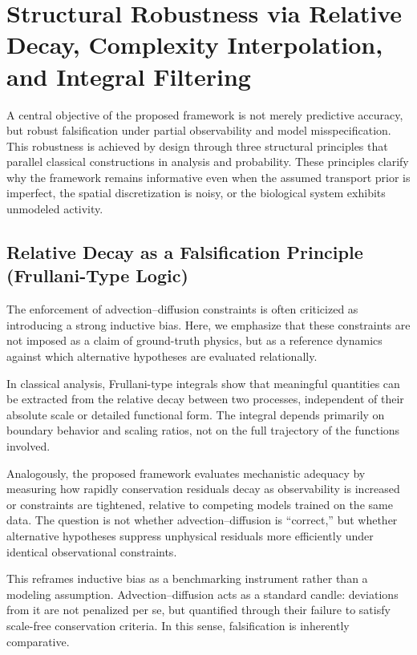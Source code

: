 \documentclass[10pt,article]{article}
\begin{document}
\section{Structural Robustness via Relative Decay, Complexity Interpolation, and Integral Filtering
}
A central objective of the proposed framework is not merely predictive accuracy, but robust falsification under partial observability and model misspecification. This robustness is achieved by design through three structural principles that parallel classical constructions in analysis and probability. These principles clarify why the framework remains informative even when the assumed transport prior is imperfect, the spatial discretization is noisy, or the biological system exhibits unmodeled activity.

\subsection{Relative Decay as a Falsification Principle (Frullani-Type Logic)}

The enforcement of advection–diffusion constraints is often criticized as introducing a strong inductive bias. Here, we emphasize that these constraints are not imposed as a claim of ground-truth physics, but as a reference dynamics against which alternative hypotheses are evaluated relationally.

In classical analysis, Frullani-type integrals show that meaningful quantities can be extracted from the relative decay between two processes, independent of their absolute scale or detailed functional form. The integral depends primarily on boundary behavior and scaling ratios, not on the full trajectory of the functions involved.

Analogously, the proposed framework evaluates mechanistic adequacy by measuring how rapidly conservation residuals decay as observability is increased or constraints are tightened, relative to competing models trained on the same data. The question is not whether advection–diffusion is “correct,” but whether alternative hypotheses suppress unphysical residuals more efficiently under identical observational constraints.

This reframes inductive bias as a benchmarking instrument rather than a modeling assumption. Advection–diffusion acts as a standard candle: deviations from it are not penalized per se, but quantified through their failure to satisfy scale-free conservation criteria. In this sense, falsification is inherently comparative.
\end{document}
